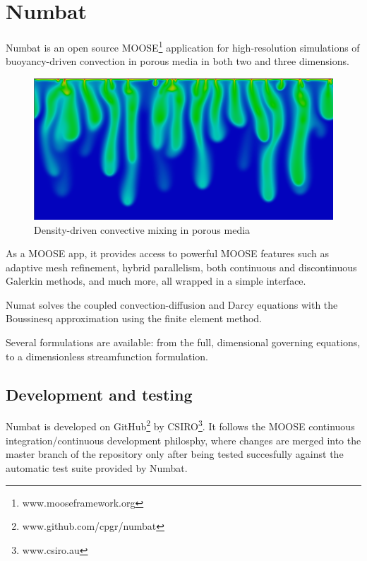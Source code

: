 \documentclass[12pt, a4paper, midday, formal]{csiroreport2017}
\begin{document}
\clearpage
\listoffigures
\clearpage
{}

%
%
\section{Numbat}

Numbat is an open source MOOSE\footnote{www.mooseframework.org} application for high-resolution simulations of buoyancy-driven convection in porous media in both two and three dimensions.

\begin{figure}[ht]
\begin{center}
\includegraphics[width=\textwidth]{../content/media/convection.png}
\caption{Density-driven convective mixing in porous media}
\label{fig:convection}
\end{center}
\end{figure}

As a MOOSE app, it provides access to powerful MOOSE features such as adaptive mesh refinement, hybrid parallelism, both continuous and discontinuous Galerkin methods, and much more, all wrapped in a simple interface.

Numat solves the coupled convection-diffusion and Darcy equations with the Boussinesq approximation using the finite element method.

Several formulations are available: from the full, dimensional governing equations, to a dimensionless streamfunction formulation.

\subsection{Development and testing}

Numbat is developed on GitHub\footnote{www.github.com/cpgr/numbat} by CSIRO\footnote{www.csiro.au}. It follows the MOOSE continuous
integration/continuous development philosphy, where changes are merged into the master branch of the repository only after being tested
succesfully against the automatic test suite provided by Numbat.
\end{document}
